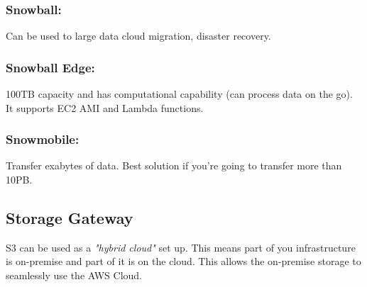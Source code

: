 \subsubsection{Snowball:} Can be used to large data cloud migration, disaster recovery.
\subsubsection{Snowball Edge:} 100TB capacity and has computational capability (can process data on the go).
It supports EC2 AMI and Lambda functions.
\subsubsection{Snowmobile:} Transfer exabytes of data.
Best solution if you're going to transfer more than 10PB\@.

\subsection{Storage Gateway}\label{subsec:storage-gateway}
S3 can be used as a \textit{"hybrid cloud"} set up.
This means part of you infrastructure is on-premise and part of it is on the cloud.
This allows the on-premise storage to seamlessly use the AWS Cloud.
